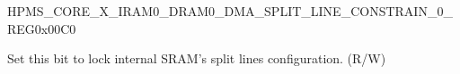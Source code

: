 \begin{register}{H}{PMS\_CORE\_X\_IRAM0\_DRAM0\_DMA\_SPLIT\_LINE\_CONSTRAIN\_0\_REG}{0x{}00C0}\label{regdesc:PMSCOREXIRAM0DRAM0DMASPLITLINECONSTRAIN0REG}
%
%
\regnewline%
\begin{regdesc}\begin{reglist}
\label{fielddesc:PMSCOREXIRAM0DRAM0DMASPLITLINECONSTRAINLOCK}\item [PMS\_CORE\_X\_IRAM0\_DRAM0\_DMA\_SPLIT\_LINE\_CONSTRAIN\_LOCK] Set this bit to lock internal SRAM's split lines configuration. (R/W)
\end{reglist}\end{regdesc}
\end{register}



